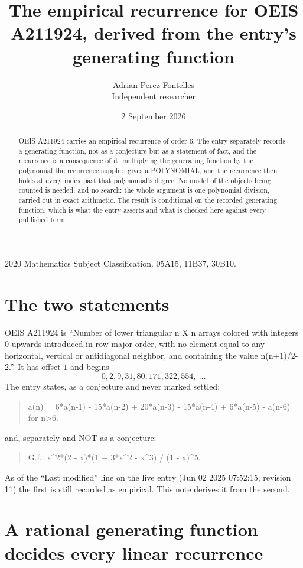 \documentclass[11pt,a4paper]{article}
\title{The empirical recurrence for OEIS A211924, derived from the entry's generating function}
\author{Adrian Perez Fontelles\\ \small Independent researcher}
\date{2 September 2026}
\theoremstyle{plain}
\theoremstyle{definition}
\begin{document}
\maketitle

\begin{abstract}
OEIS A211924 carries an empirical recurrence of order $6$. The entry separately records a
generating function, not as a conjecture but as a statement of fact, and the recurrence is a
consequence of it: multiplying the generating function by the polynomial the recurrence
supplies gives a POLYNOMIAL, and the recurrence then holds at every index past that
polynomial's degree. No model of the objects being counted is needed, and no search: the
whole argument is one polynomial division, carried out in exact arithmetic. The result is
conditional on the recorded generating function, which is what the entry asserts and what is
checked here against every published term.
\end{abstract}

\noindent\small 2020 Mathematics Subject Classification. 05A15, 11B37, 30B10.\normalsize

\section{The two statements}

OEIS A211924 is ``Number of lower triangular n X n arrays colored with integers 0 upwards introduced in row major order, with no element equal to any horizontal, vertical or antidiagonal neighbor, and containing the value n(n+1)/2-2.''. It has offset $1$ and begins
\[
0, 2, 9, 31, 80, 171, 322, 554,\ \dots
\]
The entry states, as a conjecture and never marked settled:
\begin{quote}
a(n) = 6*a(n-1) - 15*a(n-2) + 20*a(n-3) - 15*a(n-4) + 6*a(n-5) - a(n-6) for n>6.
\end{quote}
and, separately and NOT as a conjecture:
\begin{quote}
G.f.: x\^{}2*(2 - x)*(1 + 3*x\^{}2 - x\^{}3) / (1 - x)\^{}5.
\end{quote}
As of the ``Last modified'' line on the live entry (Jun 02 2025 07:52:15, revision 11) the first is still
recorded as empirical. This note derives it from the second.

\section{A rational generating function decides every linear recurrence}
\end{document}
